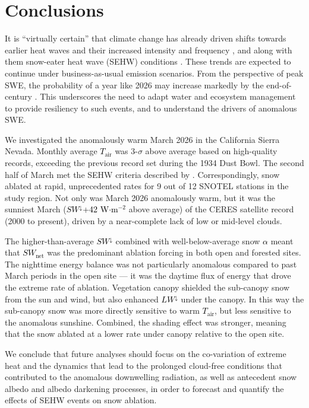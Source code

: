 \documentclass[draft]{agujournal2019}
\newcommand{\mynum}[1]{\textcolor{black}{#1}}
\newcommand{\tair}{\textcolor{black}{$T_{\mathrm{air}}$}\xspace}
\newcommand{\lwdn}{\textcolor{black}{$LW^{\downarrow}$}\xspace}
\newcommand{\swnet}{\textcolor{black}{$SW_{\mathrm{net}}$}\xspace}
\newcommand{\swdn}{\textcolor{black}{$SW^{\downarrow}$}\xspace}
\newcommand{\albedo}{\textcolor{black}{$\alpha$}\xspace}
\newcommand{\wmsq}{\textcolor{black}{W$\cdot$m$^{-2}$}\xspace}
\begin{document}
\section{Conclusions}
It is ``virtually certain'' that climate change has already driven shifts towards earlier heat waves and their increased intensity and frequency \cite{Seneviratne2023-pj}, and along with them snow-eater heat wave (SEHW) conditions \cite{Rhoades2026-jm}.
These trends are expected to continue under business-as-usual emission scenarios.
From the perspective of peak SWE, the probability of a year like 2026 may increase markedly by the end-of-century \cite{Marshall2026-sy}.
This underscores the need to adapt water and ecosystem management to provide resiliency to such events, and to understand the drivers of anomalous SWE.

We investigated the anomalously warm March 2026 in the California Sierra Nevada.
Monthly average \tair was 3-$\sigma$ above average based on high-quality records, exceeding the previous record set during the 1934 Dust Bowl. 
The second half of March met the SEHW criteria described by .
Correspondingly, snow ablated at rapid, unprecedented rates for 9 out of 12 SNOTEL stations in the study region.
Not only was March 2026 anomalously warm, but it was the sunniest March (\swdn +\mynum{42} \wmsq above average) of the CERES satellite record (2000 to present), driven by a near-complete lack of low or mid-level clouds.

The higher-than-average \swdn combined with well-below-average snow \albedo meant that \swnet was the predominant ablation forcing in both open and forested sites.
The nighttime energy balance was not particularly anomalous compared to past March periods in the open site ---
it was the daytime flux of energy that drove the extreme rate of ablation.
Vegetation canopy shielded the sub-canopy snow from the sun and wind, but also enhanced \lwdn under the canopy.
In this way the sub-canopy snow was more directly sensitive to warm \tair, but less sensitive to the anomalous sunshine.
Combined, the shading effect was stronger, meaning that the snow ablated at a lower rate under canopy relative to the open site.

We conclude that future analyses should focus on the co-variation of extreme heat and the dynamics that lead to the prolonged cloud-free conditions that contributed to the anomalous downwelling radiation, as well as antecedent snow albedo and albedo darkening processes, in order to forecast and quantify the effects of SEHW events on snow ablation.
\end{document}

